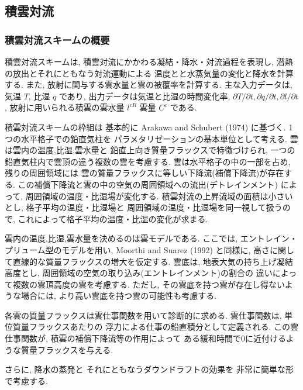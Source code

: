 ﻿
\subsection{積雲対流}

\subsubsection{積雲対流スキームの概要}

積雲対流スキームは,
積雲対流にかかわる凝結・降水・対流過程を表現し,
潜熱の放出とそれにともなう対流運動による
温度とと水蒸気量の変化と降水を計算する.
また, 放射に関与する雲水量と雲の被覆率を計算する.
主な入力データは, 気温 $T$, 比湿 $q$ であり,
出力データは気温と比湿の時間変化率,
$\partial T/\partial t, \partial q/\partial t, \partial l/\partial t$,
放射に用いられる積雲の雲水量 $l^{cR}$ 雲量 $C^c$ である.

積雲対流スキームの枠組は
基本的に Arakawa and Schubert (1974) に基づく.
1つの水平格子での鉛直気柱を
パラメタリゼーションの基本単位として考える.
雲は雲内の温度,比湿,雲水量と
鉛直上向き質量フラックスで特徴づけられ,
一つの鉛直気柱内で雲頂の違う複数の雲を考慮する.
雲は水平格子の中の一部を占め, 残りの周囲領域には
雲の質量フラックスに等しい下降流(補償下降流)が存在する.
この補償下降流と雲の中の空気の周囲領域への流出(デトレインメント)
によって, 周囲領域の温度・比湿場が変化する.
積雲対流の上昇流域の面積は小さいとし,
格子平均の温度・比湿場と
周囲領域の温度・比湿場を同一視して扱うので,
これによって格子平均の温度・比湿の変化が求まる.

雲内の温度,比湿,雲水量を決めるのは雲モデルである.
ここでは, エントレイン・プリューム型のモデルを用い,
Moorthi and Suarez (1992) と同様に,
高さに関して直線的な質量フラックスの増大を仮定する.
雲底は, 地表大気の持ち上げ凝結高度とし,
周囲領域の空気の取り込み(エントレインメント)の割合の
違いによって複数の雲頂高度の雲を考慮する.
ただし, その雲底を持つ雲が存在し得ないような場合には,
より高い雲底を持つ雲の可能性も考慮する.

各雲の質量フラックスは雲仕事関数を用いて診断的に求める.
雲仕事関数は, 単位質量フラックスあたりの
浮力による仕事の鉛直積分として定義される.
この雲仕事関数が, 積雲の補償下降流等の作用によって
ある緩和時間で0に近付けるような質量フラックスを与える.

さらに, 降水の蒸発と
それにともなうダウンドラフトの効果を
非常に簡単な形で考慮する.

